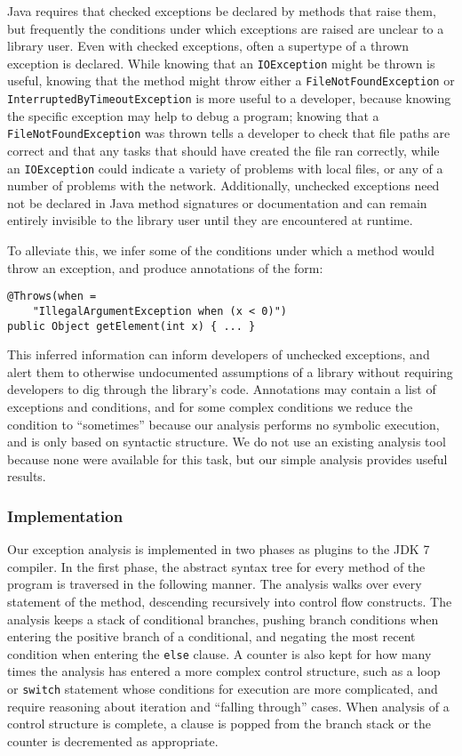 Java requires that checked exceptions be declared by methods that raise them,
but frequently the conditions under which exceptions are raised are unclear to a
library user. Even with checked exceptions, often a supertype of a thrown
exception is declared.  While knowing that an \texttt{IOException} might be
thrown is useful, knowing that the method might throw either a
\texttt{FileNotFoundException} or \texttt{InterruptedByTimeoutException} is more
useful to a developer, because knowing the specific exception may help to debug
a program; knowing that a \texttt{FileNotFoundException} was thrown tells a
developer to check that file paths are correct and that any tasks that should
have created the file ran correctly, while an \texttt{IOException} could
indicate a variety of problems with local files, or any of a number of problems
with the network.  Additionally, unchecked exceptions need not be declared in Java method
signatures or documentation and can remain entirely invisible to the library
user until they are encountered at runtime.

To alleviate this, we infer some of the conditions under which a method would
throw an exception, and produce annotations of the form:

\begin{verbatim}
@Throws(when =
    "IllegalArgumentException when (x < 0)")
public Object getElement(int x) { ... }
\end{verbatim}

This inferred information can inform developers of unchecked exceptions,
and alert them to otherwise undocumented assumptions of a library without
requiring developers to dig through the library's code.
Annotations may contain a list of exceptions and conditions, and for some
complex conditions we reduce the condition to ``sometimes'' because our analysis
performs no symbolic execution, and is only based on syntactic structure.  We do not use an
existing analysis tool because none were available for this task, but our
simple analysis provides useful results.

\subsubsection{Implementation}

Our exception analysis is implemented in two phases as plugins to the JDK 7 compiler.
In the first phase, the
abstract syntax tree for every method of the program is traversed in the
following manner.  The analysis walks over every statement of the method,
descending recursively into control flow constructs.  The analysis keeps a stack
of conditional branches, pushing branch conditions when entering the positive
branch of a conditional, and negating the most recent condition when entering
the \texttt{else} clause.  A counter is also kept for how many times the
analysis has entered a more complex control structure, such as a loop or
\texttt{switch} statement whose conditions for execution are more complicated,
and require reasoning about iteration and ``falling through'' cases.  When
analysis of a control structure is complete, a clause is popped from the
branch stack or the counter is decremented as appropriate.

